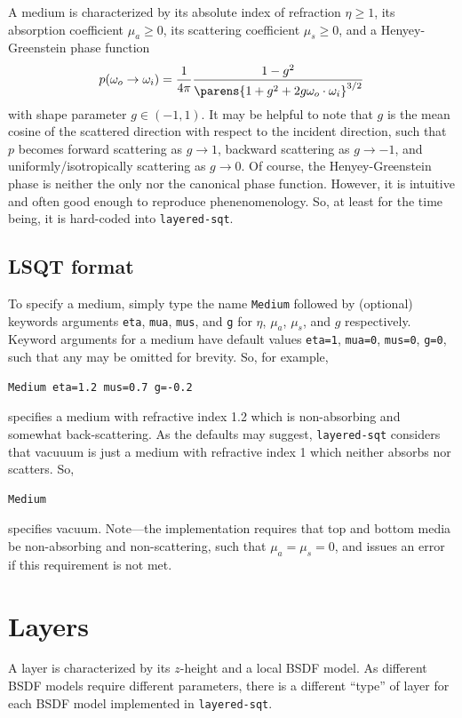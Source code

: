 \documentclass[
    twoside,
    twocolumn,
    letterpaper,
    10pt]{article}
\begin{document}
A medium is characterized by its 
absolute index of refraction $\eta \ge 1$, its absorption coefficient 
$\mu_a \ge 0 $, its scattering coefficient $\mu_s \ge 0$, and a 
Henyey-Greenstein phase function
\begin{equation*}
    p(\omega_o\to\omega_i) = 
    \frac{1}{4\pi}
    \frac{1-g^2}{\parens{1+g^2+2g\omega_o\cdot\omega_i}^{3/2}}
\end{equation*}
with shape parameter $g\in(-1,1)$. It may be helpful to note 
that $g$ is the mean cosine of the scattered direction with respect to the 
incident direction, such that $p$ becomes forward scattering as $g\to1$, 
backward scattering as $g\to-1$, and uniformly/isotropically scattering 
as $g\to0$. Of course, the Henyey-Greenstein phase is neither the only 
nor the canonical phase function. However, it is intuitive and often 
good enough to reproduce phenenomenology. So, at least for the time being, 
it is hard-coded into \texttt{layered-sqt}.

\subsection{LSQT format}

To specify a medium, simply type the name \texttt{Medium} followed 
by (optional) keywords arguments \texttt{eta}, \texttt{mua}, 
\texttt{mus}, and \texttt{g} for $\eta$, $\mu_a$, $\mu_s$, and $g$
respectively. Keyword 
arguments for a medium have default values \texttt{eta=1}, \texttt{mua=0}, 
\texttt{mus=0}, \texttt{g=0}, such that any may be omitted for brevity.
So, for example,
\begin{verbatim}
Medium eta=1.2 mus=0.7 g=-0.2
\end{verbatim}
specifies a medium with refractive index 1.2 which is non-absorbing and 
somewhat back-scattering. As the defaults may suggest, \texttt{layered-sqt}
considers that vacuuum is just a medium with refractive index 1 which neither
absorbs nor scatters. So,
\begin{verbatim}
Medium
\end{verbatim}
specifies vacuum. Note---the implementation requires that top and 
bottom media be non-absorbing and non-scattering, such that $\mu_a=\mu_s=0$,
and issues an error if this requirement is not met.

\section{Layers}

A layer is characterized by its $z$-height and 
a local BSDF model. As different BSDF models require different 
parameters, there is a different ``type'' of layer for each 
BSDF model implemented in \texttt{layered-sqt}. 
\end{document}
